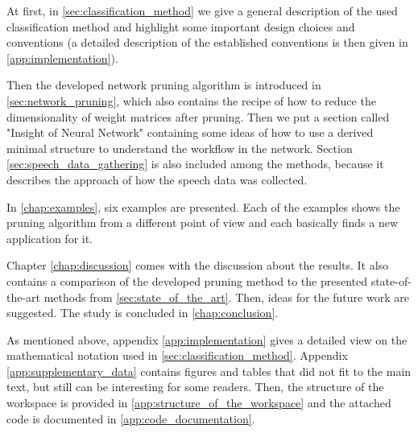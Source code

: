At first, in \cref{sec:classification_method} we give a general description of the used classification method and highlight some important design choices and conventions (a detailed description of the established conventions is then given in \cref{app:implementation}). 

Then the developed network pruning algorithm is introduced in \cref{sec:network_pruning}, which also contains the recipe of how to reduce the dimensionality of weight matrices after pruning. Then we put a section called "Insight of Neural Network" containing some ideas of how to use a derived minimal structure to understand the workflow in the network. Section \ref{sec:speech_data_gathering} is also included among the methods, because it describes the approach of how the speech data was collected.

In \cref{chap:examples}, six examples are presented. Each of the examples shows the pruning algorithm from a different point of view and each basically finds a new application for it.

Chapter \ref{chap:discussion} comes with the discussion about the results. It also contains a comparison of the developed pruning method to the presented state-of-the-art methods from \cref{sec:state_of_the_art}. Then, ideas for the future work are suggested. The study is concluded in \cref{chap:conclusion}.

As mentioned above, appendix \ref{app:implementation} gives a detailed view on the mathematical notation used in \cref{sec:classification_method}. Appendix \ref{app:supplementary_data} contains figures and tables that did not fit to the main text, but still can be interesting for some readers. Then, the structure of the workspace is provided in \cref{app:structure_of_the_workspace} and the attached code is documented in \cref{app:code_documentation}.